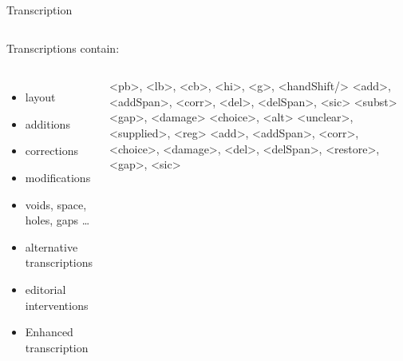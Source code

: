 \begin{frame}{Transcription}
\begin{columns}
\end{columns}

\framebreak

Transcriptions contain: 
\begin{columns}
\begin{itemize}
\item  layout
\item  additions
\item  corrections
\item  modifications
\item  voids, space, holes, gaps \dots
\item  alternative transcriptions
\item  editorial interventions
\item  Enhanced transcription
\end{itemize}

\begin{xmlcode}
<pb>, <lb>, <cb>, <hi>, <g>, 
<handShift/>
<add>, <addSpan>,
<corr>, <del>, <delSpan>, <sic>
<subst>
<gap>, <damage>
<choice>, <alt>
<unclear>, <supplied>, <reg>
<add>, <addSpan>, <corr>, <choice>, 
<damage>, <del>, <delSpan>, 
<restore>, <gap>, <sic>
\end{xmlcode}
\end{columns}

\end{frame}


